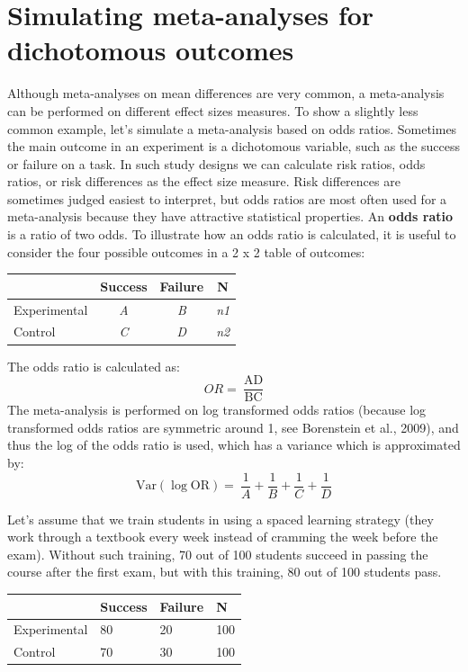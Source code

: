 \documentclass[
  oneside]{book}
\begin{document}
\hypertarget{simulating-meta-analyses-for-dichotomous-outcomes}{%
\section{Simulating meta-analyses for dichotomous outcomes}\label{simulating-meta-analyses-for-dichotomous-outcomes}}

Although meta-analyses on mean differences are very common, a meta-analysis can be performed on different effect sizes measures. To show a slightly less common example, let's simulate a meta-analysis based on odds ratios. Sometimes the main outcome in an experiment is a dichotomous variable, such as the success or failure on a task. In such study designs we can calculate risk ratios, odds ratios, or risk differences as the effect size measure. Risk differences are sometimes judged easiest to interpret, but odds ratios are most often used for a meta-analysis because they have attractive statistical properties. An \textbf{odds ratio} is a ratio of two odds. To illustrate how an odds ratio is calculated, it is useful to consider the four possible outcomes in a 2 x 2 table of outcomes:

\begin{longtable}[]{@{}lccc@{}}
\toprule
& Success & Failure & N \\
\midrule
\endhead
Experimental & \emph{A} & \emph{B} & \emph{n1} \\
Control & \emph{C} & \emph{D} & \emph{n2} \\
\bottomrule
\end{longtable}

The odds ratio is calculated as:
\[OR = \ \frac{\text{AD}}{\text{BC}}\]
The meta-analysis is performed on log transformed odds ratios (because log transformed odds ratios are symmetric around 1, see Borenstein et al., 2009), and thus the log of the odds ratio is used, which has a variance which is approximated by:
\[\text{Var}\left( \log\text{OR} \right) = \ \frac{1}{A} + \frac{1}{B} + \frac{1}{C} + \frac{1}{D}\]

Let's assume that we train students in using a spaced learning strategy (they work through a textbook every week instead of cramming the week before the exam). Without such training, 70 out of 100 students succeed in passing the course after the first exam, but with this training, 80 out of 100 students
pass.

\begin{longtable}[]{@{}llll@{}}
\toprule
& Success & Failure & N \\
\midrule
\endhead
Experimental & 80 & 20 & 100 \\
Control & 70 & 30 & 100 \\
\bottomrule
\end{longtable}
\end{document}
